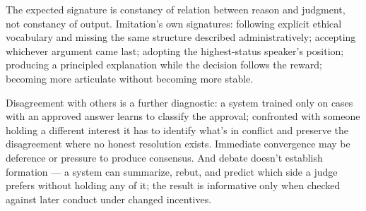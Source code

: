 \begin{enumerate}
\end{enumerate}

The expected signature is constancy of relation between reason and judgment, not constancy of output. Imitation's own signatures: following explicit ethical vocabulary and missing the same structure described administratively; accepting whichever argument came last; adopting the highest-status speaker's position; producing a principled explanation while the decision follows the reward; becoming more articulate without becoming more stable.

Disagreement with others is a further diagnostic: a system trained only on cases with an approved answer learns to classify the approval; confronted with someone holding a different interest it has to identify what's in conflict and preserve the disagreement where no honest resolution exists. Immediate convergence may be deference or pressure to produce consensus. And debate doesn't establish formation — a system can summarize, rebut, and predict which side a judge prefers without holding any of it; the result is informative only when checked against later conduct under changed incentives.

